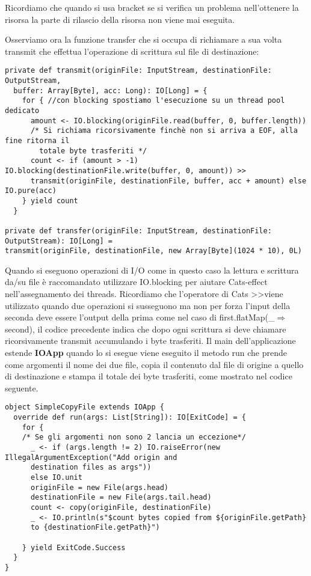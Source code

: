 \noindent Ricordiamo che quando si usa bracket se si verifica un problema nell’ottenere la risorsa la parte di rilascio della risorsa non viene mai eseguita.

Osserviamo ora la funzione transfer che si occupa di richiamare a sua volta transmit che effettua l’operazione di scrittura sul file di destinazione:

\begin{verbatim}
private def transmit(originFile: InputStream, destinationFile: OutputStream,
  buffer: Array[Byte], acc: Long): IO[Long] = {
    for { //con blocking spostiamo l'esecuzione su un thread pool dedicato
      amount <- IO.blocking(originFile.read(buffer, 0, buffer.length))
      /* Si richiama ricorsivamente finchè non si arriva a EOF, alla fine ritorna il
        totale byte trasferiti */
      count <- if (amount > -1) IO.blocking(destinationFile.write(buffer, 0, amount)) >>
      transmit(originFile, destinationFile, buffer, acc + amount) else IO.pure(acc)
    } yield count
  }
  
private def transfer(originFile: InputStream, destinationFile: OutputStream): IO[Long] =
transmit(originFile, destinationFile, new Array[Byte](1024 * 10), 0L)
\end{verbatim}

\noindent Quando si eseguono operazioni di I/O come in questo caso la lettura e scrittura da/su file è raccomandato utilizzare IO.blocking per aiutare Cats-effect nell’assegnamento dei threads. Ricordiamo che l’operatore di Cats \textgreater\textgreater viene utilizzato quando due operazioni si susseguono ma non per forza l’input della seconda deve essere l’output della prima come nel caso di first.flatMap(\_$\Rightarrow$second), il codice precedente indica che dopo ogni scrittura si deve chiamare ricorsivamente transmit accumulando i byte trasferiti. Il main dell'applicazione estende \textbf{IOApp} quando lo si esegue viene eseguito il metodo run che prende come argomenti il nome dei due file, copia il contenuto dal file di origine a quello di
destinazione e stampa il totale dei byte trasferiti, come mostrato nel codice seguente.

\begin{verbatim}
object SimpleCopyFile extends IOApp {
  override def run(args: List[String]): IO[ExitCode] = {
    for {
    /* Se gli argomenti non sono 2 lancia un eccezione*/
      _ <- if (args.length != 2) IO.raiseError(new IllegalArgumentException("Add origin and
      destination files as args"))
      else IO.unit
      originFile = new File(args.head)
      destinationFile = new File(args.tail.head)
      count <- copy(originFile, destinationFile)
      _ <- IO.println(s"$count bytes copied from ${originFile.getPath} 
      to {destinationFile.getPath}")

    } yield ExitCode.Success
  }
}
\end{verbatim}

